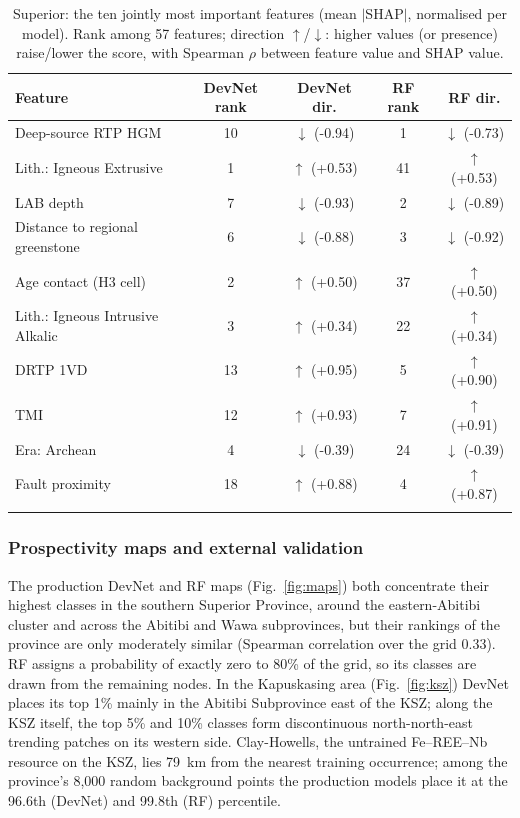 \documentclass[pdflatex,sn-apa]{sn-jnl}
\begin{document}
\begin{table}[t]
\caption{Superior: the ten jointly most important features (mean $|$SHAP$|$, normalised per model). Rank among 57 features; direction $\uparrow$/$\downarrow$: higher values (or presence) raise/lower the score, with Spearman $\rho$ between feature value and SHAP value.}\label{tab:shap}
\scriptsize
\setlength{\tabcolsep}{2.5pt}
\begin{tabular*}{\textwidth}{@{\extracolsep\fill}lcccc}
\toprule
Feature & DevNet rank & DevNet dir. & RF rank & RF dir. \\
\midrule
Deep-source RTP HGM & 10 & $\downarrow$ (-0.94) & 1 & $\downarrow$ (-0.73) \\
Lith.: Igneous Extrusive & 1 & $\uparrow$ (+0.53) & 41 & $\uparrow$ (+0.53) \\
LAB depth & 7 & $\downarrow$ (-0.93) & 2 & $\downarrow$ (-0.89) \\
Distance to regional greenstone & 6 & $\downarrow$ (-0.88) & 3 & $\downarrow$ (-0.92) \\
Age contact (H3 cell) & 2 & $\uparrow$ (+0.50) & 37 & $\uparrow$ (+0.50) \\
Lith.: Igneous Intrusive Alkalic & 3 & $\uparrow$ (+0.34) & 22 & $\uparrow$ (+0.34) \\
DRTP 1VD & 13 & $\uparrow$ (+0.95) & 5 & $\uparrow$ (+0.90) \\
TMI & 12 & $\uparrow$ (+0.93) & 7 & $\uparrow$ (+0.91) \\
Era: Archean & 4 & $\downarrow$ (-0.39) & 24 & $\downarrow$ (-0.39) \\
Fault proximity & 18 & $\uparrow$ (+0.88) & 4 & $\uparrow$ (+0.87) \\
\botrule
\end{tabular*}
\end{table}

\subsubsection{Prospectivity maps and external validation}\label{sec:res-maps}

The production DevNet and RF maps (Fig.~\ref{fig:maps}) both concentrate their highest classes in the southern Superior Province, around the eastern-Abitibi cluster and across the Abitibi and Wawa subprovinces, but their rankings of the province are only moderately similar (Spearman correlation over the grid 0.33). RF assigns a probability of exactly zero to 80\% of the grid, so its classes are drawn from the remaining nodes. In the Kapuskasing area (Fig.~\ref{fig:ksz}) DevNet places its top 1\% mainly in the Abitibi Subprovince east of the KSZ; along the KSZ itself, the top 5\% and 10\% classes form discontinuous north-north-east trending patches on its western side. Clay-Howells, the untrained Fe--REE--Nb resource on the KSZ, lies 79~km from the nearest training occurrence; among the province's 8,000 random background points the production models place it at the 96.6th (DevNet) and 99.8th (RF) percentile.
\end{document}
